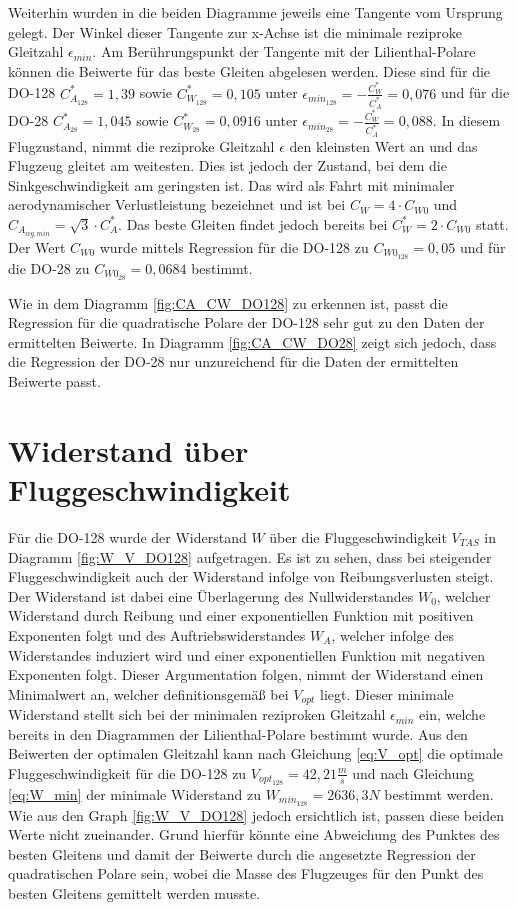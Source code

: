 Weiterhin wurden in die beiden Diagramme jeweils eine Tangente vom Ursprung gelegt. Der Winkel dieser Tangente zur x-Achse ist die minimale reziproke Gleitzahl $\epsilon_{min}$. Am Berührungspunkt der Tangente mit der Lilienthal-Polare können die Beiwerte für das beste Gleiten abgelesen werden. Diese sind für die DO-128 $C_{A_{128}}^* = 1,39$ sowie $C_{W_{128}}^* = 0,105$ unter $\epsilon_{min_{128}} = - \frac {C_W^*}{C_A^*} = 0,076$ und für die DO-28 $C_{A_{28}}^* = 1,045$ sowie $C_{W_{28}}^* = 0,0916$ unter $\epsilon_{min_{28}} = - \frac {C_W^*}{C_A^*} = 0,088$. In diesem Flugzustand, nimmt die reziproke Gleitzahl $\epsilon$ den kleinsten Wert an und das Flugzeug gleitet am weitesten. Dies ist jedoch der Zustand, bei dem die Sinkgeschwindigkeit am geringsten ist. Das wird als Fahrt mit minimaler aerodynamischer Verlustleistung bezeichnet und ist bei $C_W = 4 \cdot C_{W0}$ und $C_{A_{wg,min}} = \sqrt{3} \cdot C_A^*$. Das beste Gleiten findet jedoch bereits bei $C_W^* = 2 \cdot C_{W0}$ statt. Der Wert $C_{W0}$ wurde mittels Regression für die DO-128 zu $C_{W0_{128}} = 0,05$ und für die DO-28 zu $C_{W0_{28}} = 0,0684$ bestimmt. 


Wie in dem Diagramm \ref{fig:CA_CW_DO128} zu erkennen ist, passt die Regression für die quadratische Polare der DO-128 sehr gut zu den Daten der ermittelten Beiwerte. In Diagramm \ref{fig:CA_CW_DO28} zeigt sich jedoch, dass die Regression der DO-28 nur unzureichend für die Daten der ermittelten Beiwerte passt.


\section{Widerstand über Fluggeschwindigkeit}
Für die DO-128 wurde der Widerstand $W$ über die Fluggeschwindigkeit $V_{TAS}$ in Diagramm \ref{fig:W_V_DO128} aufgetragen. Es ist zu sehen, dass bei steigender Fluggeschwindigkeit auch der Widerstand infolge von Reibungsverlusten steigt. Der Widerstand ist dabei eine Überlagerung des Nullwiderstandes $W_0$, welcher Widerstand durch Reibung und einer exponentiellen Funktion mit positiven Exponenten folgt und des Auftriebswiderstandes $W_A$, welcher infolge des Widerstandes induziert wird und einer exponentiellen Funktion mit negativen Exponenten folgt. Dieser Argumentation folgen, nimmt der Widerstand einen Minimalwert an, welcher definitionsgemäß bei $V_{opt}$ liegt. Dieser minimale Widerstand stellt sich bei der minimalen reziproken Gleitzahl $\epsilon_{min}$ ein, welche bereits in den Diagrammen der Lilienthal-Polare bestimmt wurde. Aus den Beiwerten der optimalen Gleitzahl kann nach Gleichung \ref{eq:V_opt} die optimale Fluggeschwindigkeit für die DO-128 zu $V_{opt_{128}} = 42,21 \frac{m}{s}$ und nach Gleichung \ref{eq:W_min} der minimale Widerstand zu $W_{min_{128}} = 2636,3 N$ bestimmt werden. Wie aus den Graph \ref{fig:W_V_DO128} jedoch ersichtlich ist, passen diese beiden Werte nicht zueinander. Grund hierfür könnte eine Abweichung des Punktes des besten Gleitens und damit der Beiwerte durch die angesetzte Regression der quadratischen Polare sein, wobei die Masse des Flugzeuges für den Punkt des besten Gleitens gemittelt werden musste. 


